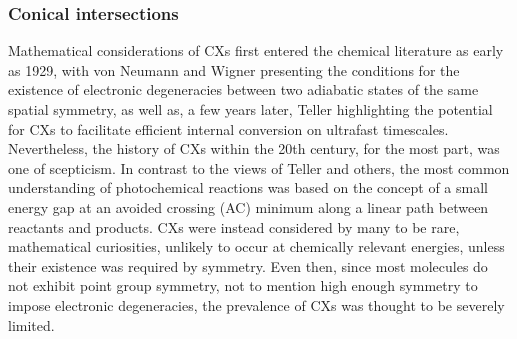 \documentclass[9pt,bestpractices,pubversion]{livecoms}
\begin{document}
\subsubsection{Conical intersections}
\label{ch2_cx}

Mathematical considerations of CXs first entered the chemical literature as early as 1929, with von Neumann and Wigner\cite{vonneumann1929eigenvalues} presenting the conditions for the existence of electronic degeneracies between two adiabatic states of the same spatial symmetry, as well as, a few years later, Teller\cite{teller_crossing_1937} highlighting the potential for CXs to facilitate efficient internal conversion on ultrafast timescales.
Nevertheless, the history of CXs within the 20th century, for the most part, was one of scepticism.
In contrast to the views of Teller and others,\cite{zimmerman_molecular_1966,michl_physical_1974} the most common understanding of photochemical reactions was based on the concept of a small energy gap at an avoided crossing (AC) minimum\cite{van_der_lugt_symmetry_1969} along a linear path between reactants and products.\cite{schapiro_using_2011}
CXs were instead considered by many to be rare, mathematical curiosities, unlikely to occur at chemically relevant energies, unless their existence was required by symmetry.\cite{levine2007isomerization}
Even then, since most molecules do not exhibit point group symmetry, not to mention high enough symmetry to impose electronic degeneracies, the prevalence of CXs was thought to be severely limited.\cite{yarkony_nonadiabatic_2012}
\end{document}
